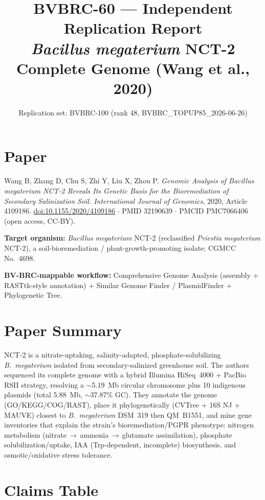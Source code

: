 \documentclass[11pt]{article}
\title{BVBRC-60 --- Independent Replication Report\\
\large \textit{Bacillus megaterium} NCT-2 Complete Genome (Wang et al., 2020)}
\author{Replication set: BVBRC-100 (rank 48, BVBRC\_TOPUP85\_2026-06-26)}
\date{}
\begin{document}
\maketitle

\section*{Paper}
Wang B, Zhang D, Chu S, Zhi Y, Liu X, Zhou P.
\emph{Genomic Analysis of Bacillus megaterium NCT-2 Reveals Its Genetic Basis for the Bioremediation of Secondary Salinization Soil.}
\emph{International Journal of Genomics}, 2020, Article 4109186.
\href{https://doi.org/10.1155/2020/4109186}{doi:10.1155/2020/4109186} $\cdot$
PMID 32190639 $\cdot$ PMCID PMC7066406 (open access, CC-BY).

\textbf{Target organism:} \emph{Bacillus megaterium} NCT-2 (reclassified \emph{Priestia megaterium} NCT-2), a soil-bioremediation / plant-growth-promoting isolate; CGMCC No.~4698.

\textbf{BV-BRC-mappable workflow:} Comprehensive Genome Analysis (assembly + RASTtk-style annotation) + Similar Genome Finder / PlasmidFinder + Phylogenetic Tree.

\section{Paper Summary}

NCT-2 is a nitrate-uptaking, salinity-adapted, phosphate-solubilizing \emph{B.\ megaterium} isolated from secondary-salinized greenhouse soil. The authors sequenced its complete genome with a hybrid Illumina HiSeq~4000 + PacBio RSII strategy, resolving a $\sim$5.19~Mb circular chromosome plus 10 indigenous plasmids (total 5.88~Mb, $\sim$37.87\% GC). They annotate the genome (GO/KEGG/COG/RAST), place it phylogenetically (CVTree + 16S NJ + MAUVE) closest to \emph{B.~megaterium} DSM~319 then QM~B1551, and mine gene inventories that explain the strain's bioremediation/PGPR phenotype: nitrogen metabolism (nitrate\,$\rightarrow$\,ammonia\,$\rightarrow$\,glutamate assimilation), phosphate solubilization/uptake, IAA (Trp-dependent, incomplete) biosynthesis, and osmotic/oxidative stress tolerance.

\section{Claims Table}
\end{document}
